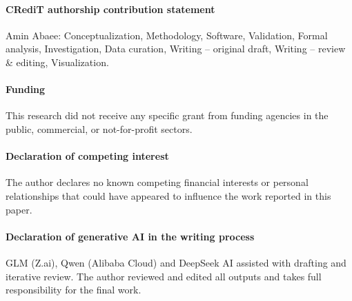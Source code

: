 \documentclass[preprint,11pt,authoryear]{elsarticle}
\theoremstyle{definition}
\theoremstyle{remark}
\begin{document}
\paragraph{CRediT authorship contribution statement} Amin Abaee: Conceptualization, Methodology, Software, Validation, Formal analysis, Investigation, Data curation, Writing -- original draft, Writing -- review \& editing, Visualization.

\paragraph{Funding} This research did not receive any specific grant from funding agencies in the public, commercial, or not-for-profit sectors.

\paragraph{Declaration of competing interest} The author declares no known competing financial interests or personal relationships that could have appeared to influence the work reported in this paper.

\paragraph{Declaration of generative AI in the writing process} GLM (Z.ai), Qwen (Alibaba Cloud) and DeepSeek AI assisted with drafting and iterative review. The author reviewed and edited all outputs and takes full responsibility for the final work.
\end{document}
